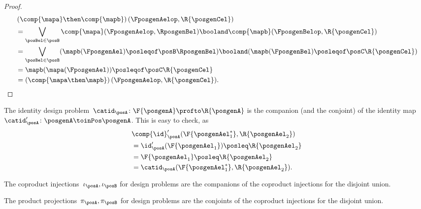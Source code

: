 \begin{proof}
	\begin{equation}
		\begin{aligned}
			~ & \left(\comp{\mapa}\then \comp{\mapb}\right)(\FposgenAelop,\R{\posgenCel})                                                            \\
			  & =\bigvee_{\posBel\in \posB} \comp{\mapa}(\FposgenAelop,\RposgenBel)\booland\comp{\mapb}(\FposgenBelop,\R{\posgenCel})                \\%
			  & =\bigvee_{\posBel\in \posB} (\mapb(\FposgenAel)\posleqof\posB \RposgenBel)\booland (\mapb(\FposgenBel)\posleqof\posC \R{\posgenCel}) \\
			  & =\mapb(\mapa(\FposgenAel))\posleqof\posC \R{\posgenCel}                                                                              \\
			  & =\left(\comp{\mapa\then \mapb}\right)(\FposgenAelop,\R{\posgenCel}).
		\end{aligned}
	\end{equation}
\end{proof}

\begin{example}
	The identity design problem~$\catid_\posA\colon \F{\posgenA} \profto \R{\posgenA}$ is the companion (and the conjoint) of the identity map~$\catid_\posA'\colon \posgenA \toinPos \posgenA$.
	This is easy to check, as
	\begin{equation}
		\begin{aligned}
			~ & \comp{\id}_\posA'(\F{\posgenAel_1^*},\R{\posgenAel_2}) \\
			  & =\id_\posA'(\F{\posgenAel_1})\posleq \R{\posgenAel_2}  \\
			  & =\F{\posgenAel_1}\posleq \R{\posgenAel_2}              \\
			  & =\catid_\posA(\F{\posgenAel_1^*},\R{\posgenAel_2}).
		\end{aligned}
	\end{equation}
\end{example}

\begin{example}
	The coproduct injections~$\iota_\posA, \iota_\posB$ for design problems are the companions of the coproduct injections for the disjoint union.
\end{example}

\begin{example}
	The product projections~$\pi_\posA, \pi_\posB$ for design problems are the conjoints of the coproduct injections for the disjoint union.
\end{example}

